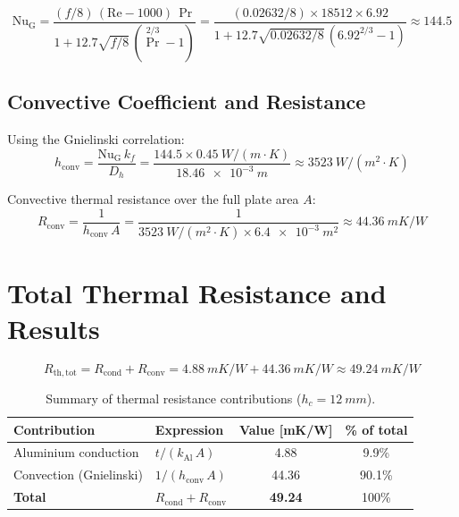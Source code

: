 \documentclass[a4paper,11pt]{article}
\begin{document}
\begin{equation}
  \mathrm{Nu}_{\mathrm{G}} = \frac{(f/8)\,(\mathrm{Re}-1000)\,\Pr}
                         {1 + 12.7\sqrt{f/8}\,(\Pr^{2/3}-1)}
                  = \frac{(0.02632/8)\times 18512 \times 6.92}
                         {1 + 12.7\sqrt{0.02632/8}\,(6.92^{2/3}-1)}
                  \approx 144.5
\end{equation}

\subsection{Convective Coefficient and Resistance}

Using the Gnielinski correlation:
\begin{equation}
  h_{\mathrm{conv}} = \frac{\mathrm{Nu}_{\mathrm{G}}\,k_f}{D_h}
                    = \frac{144.5 \times \SI{0.45}{W/(m\cdot K)}}{\SI{18.46e-3}{m}}
                    \approx \SI{3523}{W/(m^2\cdot K)}
\end{equation}

Convective thermal resistance over the full plate area $A$:
\begin{equation}
  \boxed{R_{\mathrm{conv}} = \frac{1}{h_{\mathrm{conv}}\,A}
                            = \frac{1}{\SI{3523}{W/(m^2\cdot K)}\times\SI{6.4e-3}{m^2}}
                            \approx \SI{44.36}{mK/W}}
\end{equation}

\section{Total Thermal Resistance and Results}

\begin{equation}
  R_{\mathrm{th,tot}} = R_{\mathrm{cond}} + R_{\mathrm{conv}}
                      = \SI{4.88}{mK/W} + \SI{44.36}{mK/W}
                      \approx \SI{49.24}{mK/W}
\end{equation}

\begin{table}[H]
\centering
\caption{Summary of thermal resistance contributions ($h_c = \SI{12}{mm}$).}
\begin{tabular}{llcc}
\toprule
Contribution & Expression & Value [\si{mK/W}] & \% of total \\
\midrule
Aluminium conduction    & $t/(k_{\mathrm{Al}}\,A)$      &  4.88 &  9.9\% \\
Convection (Gnielinski) & $1/(h_{\mathrm{conv}}\,A)$    & 44.36 & 90.1\% \\
\midrule
\textbf{Total} & $R_{\mathrm{cond}}+R_{\mathrm{conv}}$ & \textbf{49.24} & 100\% \\
\bottomrule
\end{tabular}
\end{table}
\end{document}
